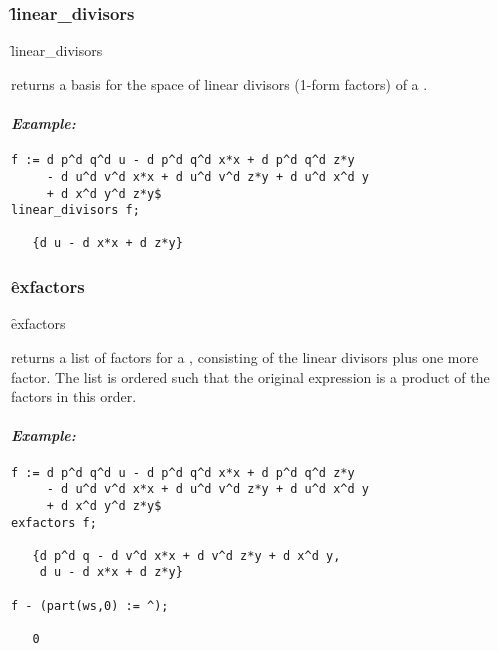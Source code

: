 



\subsubsection{\f{linear\_divisors}}
\label{linear_divisors}

\hypertarget{operator:LINEAR_DIVISORS}{}
\begin{syntax}
	\f{linear\_divisors} 
\end{syntax}
returns a basis for the space of linear divisors (1-form factors) of a
.

\paragraph{\textit{Example:}}
\begin{verbatim}
f := d p^d q^d u - d p^d q^d x*x + d p^d q^d z*y
     - d u^d v^d x*x + d u^d v^d z*y + d u^d x^d y
     + d x^d y^d z*y$
linear_divisors f;

   {d u - d x*x + d z*y}
\end{verbatim}

\subsubsection{\f{exfactors}}
\label{exfactors}

\hypertarget{operator:EXFACTORS}{}
\begin{syntax}
	\f{exfactors} 
\end{syntax}
returns a list of factors for a , consisting of the linear
divisors plus one more factor. The list is ordered such that the original
expression is a product of the factors in this order.

\paragraph{\textit{Example:}}
\begin{verbatim}
f := d p^d q^d u - d p^d q^d x*x + d p^d q^d z*y
     - d u^d v^d x*x + d u^d v^d z*y + d u^d x^d y
     + d x^d y^d z*y$
exfactors f;

   {d p^d q - d v^d x*x + d v^d z*y + d x^d y,
    d u - d x*x + d z*y}

f - (part(ws,0) := ^);

   0
\end{verbatim}

